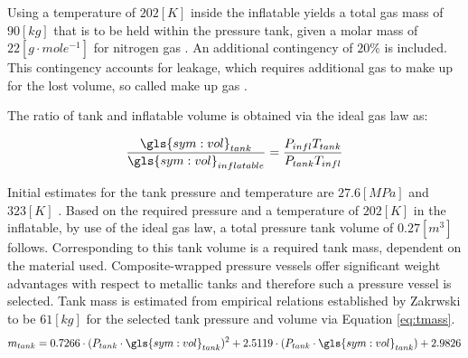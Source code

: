 Using a temperature of $202 \left[K\right]$ inside the inflatable yields a total gas mass of $90 \left[kg\right]$ that is to be held within the pressure tank, given a molar mass of $22 \left[g\cdot mole^{-1}\right]$ for nitrogen gas \cite{Samareh2011}. An additional contingency of $20\%$ is included. This contingency accounts for leakage, which requires additional gas to make up for the lost volume, so called make up gas \cite{Jenkins2001}.

The ratio of tank and inflatable volume is obtained via the ideal gas law as:

\begin{equation}
\frac{\gls{sym:vol}_{tank}}{\gls{sym:vol}_{inflatable}} = \frac{P_{infl}T_{tank}}{P_{tank}T_{infl}}
\label{eq:volratio}
\end{equation}

Initial estimates for the tank pressure and temperature are $27.6 \left[MPa\right]$ and $323 \left[K\right]$ \cite[p.545]{Wertz2011}. Based on the required pressure and a temperature of $202 \left[K\right]$ in the inflatable, by use of the ideal gas law, a total pressure tank volume of $0.27 \left[m^{3}\right]$ follows. Corresponding to this tank volume is a required tank mass, dependent on the material used. Composite-wrapped pressure vessels offer significant weight advantages with respect to metallic tanks and therefore such a pressure vessel is selected. Tank mass is estimated from empirical relations established by Zakrwski \cite[p.546]{Wertz2011} to be $61 \left[kg\right]$ for the selected tank pressure and volume via Equation \ref{eq:tmass}.
\begin{equation}
m_{tank} = 0.7266 \cdot (P_{tank} \cdot \gls{sym:vol}_{tank})^{2} + 2.5119 \cdot (P_{tank} \cdot \gls{sym:vol}_{tank}) + 2.9826
\label{eq:tmass}
\end{equation}

